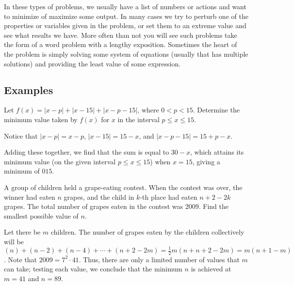 \documentclass[blue,onecol]{shooting}
\begin{document}
In these types of problems, we usually have a list of numbers or actions and want to minimize of maximize some output. In many cases we try to perturb one of the properties or variables given in the problem, or set them to an extreme value and see what results we have. More often than not you will see such problems take the form of a word problem with a lengthy exposition. Sometimes the heart of the problem is simply solving some system of equations (usually that has multiple solutions) and providing the least value of some expression.  

\subsection{Examples}
\begin{exam}[AIME 1983/2]
Let $f(x)=|x-p|+|x-15|+|x-p-15|$, where $0<p<15$. Determine the minimum value taken by $f(x)$ for $x$ in the interval $p\le x\le 15$. 
\end{exam}
\begin{sol}
Notice that $|x-p|=x-p$, $|x-15|=15-x$, and $|x-p-15|=15+p-x$.

Adding these together, we find that the sum is equal to $30-x$, which attains its minimum value (on the given interval $p \leq x \leq 15$) when $x=15$, giving a minimum of $\boxed{015}$.
\end{sol}

\begin{exam}[AIME II 2009/4]
A group of children held a grape-eating contest. When the contest was over, the winner had eaten $n$ grapes, and the child in $k$-th place had eaten $n+2-2k$ grapes. The total number of grapes eaten in the contest was $2009$. Find the smallest possible value of $n$.
\end{exam}
\begin{sol}
Let there be $m$ children. The number of grapes eaten by the children collectively will be $(n)+(n-2)+(n-4)+\cdots+(n+2-2m)=\frac12m(n+n+2-2m)=m(n+1-m)$. Note that $2009=7^2\cdot 41$. Thus, there are only a limited number of values that $m$ can take; testing each value, we conclude that the minimum $n$ is achieved at $m=41$ and $n=89$. 
\end{sol}
\end{document}
